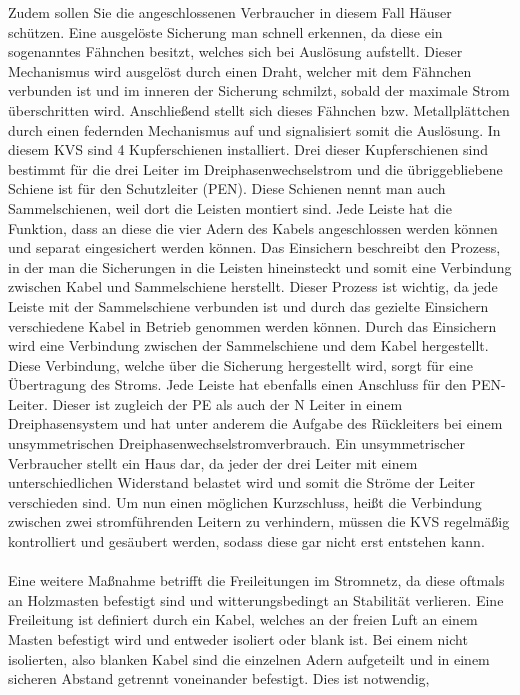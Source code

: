 Zudem sollen Sie die angeschlossenen Verbraucher in diesem Fall Häuser schützen. Eine ausgelöste Sicherung man schnell erkennen, da diese ein sogenanntes 
Fähnchen besitzt, welches sich bei Auslösung aufstellt. 
Dieser Mechanismus wird ausgelöst durch einen Draht, welcher mit dem Fähnchen verbunden ist und im inneren der Sicherung schmilzt, sobald der maximale Strom 
überschritten wird. Anschließend stellt sich dieses Fähnchen bzw. Metallplättchen durch einen federnden Mechanismus auf und signalisiert somit die Auslösung. 
In diesem KVS sind 4 Kupferschienen installiert. Drei dieser Kupferschienen sind bestimmt für die drei Leiter im Dreiphasenwechselstrom und die übriggebliebene 
Schiene ist für den Schutzleiter (PEN). Diese Schienen nennt man auch Sammelschienen, weil dort die Leisten montiert sind. Jede Leiste hat die Funktion,
dass an diese die vier Adern des Kabels angeschlossen werden können und separat eingesichert werden können. Das Einsichern beschreibt den Prozess, in der 
man die Sicherungen in die Leisten hineinsteckt und somit eine Verbindung zwischen Kabel und Sammelschiene herstellt. Dieser Prozess ist wichtig, da 
jede Leiste mit der Sammelschiene verbunden ist und durch das gezielte Einsichern verschiedene Kabel in Betrieb genommen werden können. Durch das Einsichern
wird eine Verbindung zwischen der Sammelschiene und dem Kabel hergestellt. Diese Verbindung, welche über die Sicherung hergestellt wird, sorgt für eine 
Übertragung des Stroms. Jede Leiste hat ebenfalls einen Anschluss für den PEN-Leiter. Dieser ist zugleich der PE als auch der N Leiter in einem 
Dreiphasensystem und hat unter anderem die Aufgabe des Rückleiters bei einem unsymmetrischen Dreiphasenwechselstromverbrauch. Ein unsymmetrischer 
Verbraucher stellt \zB ein Haus dar, da jeder der drei Leiter mit einem unterschiedlichen Widerstand belastet wird und somit die Ströme der Leiter verschieden 
sind. Um nun einen möglichen Kurzschluss, heißt die Verbindung zwischen zwei stromführenden Leitern zu verhindern, müssen die KVS regelmäßig kontrolliert und 
gesäubert werden, sodass diese gar nicht erst entstehen kann. \autocite{Weigerber.2013}
\\\\ 
Eine weitere Maßnahme betrifft die Freileitungen im Stromnetz, da diese oftmals an Holzmasten befestigt sind und witterungsbedingt an Stabilität verlieren. 
Eine Freileitung ist definiert durch ein Kabel, welches an der freien Luft an einem Masten befestigt wird und entweder isoliert oder blank ist. Bei einem 
nicht isolierten, also blanken Kabel sind die einzelnen Adern aufgeteilt und in einem sicheren Abstand getrennt voneinander befestigt. Dies ist notwendig, 
